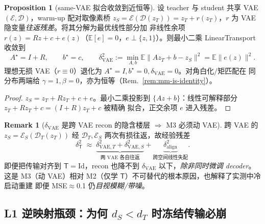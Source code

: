 \documentclass[11pt,a4paper]{article}
\newcommand{\E}{\mathbb{E}}
\newcommand{\Enc}{\mathcal{E}}
\newcommand{\Dec}{\mathcal{D}}
\newcommand{\Tmap}{\mathsf{T}}
\theoremstyle{definition}
\newtheorem{remark}{Remark}
\newtheorem{proposition}{Proposition}
\begin{document}
\begin{proposition}[same-VAE 拟合收敛到近恒等]
\label{prop:samevae-identity}
设 teacher 与 student 共享 VAE $(\Enc,\Dec)$，warm-up 配对取像素桥
$z_S=\Enc(\Dec(z_T))=z_T+r(z_T)$，$r$ 为 VAE 隐变量\emph{往返残差}。将其分解为最优线性部分加
非线性余项 $r(z)=Rz+c+e(z)$（$\E[e]=0$，$e\perp\{z,1\}$）。则最小二乘 LinearTransport 收敛到
\[
A^\star=I+R,\qquad b^\star=c,\qquad
\delta_{\mathrm{VAE}}^2:=\min_{A,b}\E\lVert Az_T+b-z_S\rVert^2=\E\lVert e(z)\rVert^2 .
\]
理想无损 VAE（$r\equiv0$）退化为 $A^\star=I,b^\star=0,\delta_{\mathrm{VAE}}=0$。对角白化/矩匹配在
同分布两端给 $\gamma{=}1,\beta{=}0$，亦为恒等（Rem.~\ref{rem:mm-is-identity}）。
\end{proposition}
\begin{proof}
$z_S=z_T+Rz_T+c+e$。最小二乘投影到 $\{Az+b\}$：线性可解释部分 $z_T+Rz_T+c=(I+R)z_T+c$ 被精确
拟合，正交余项 $e$ 进入残差。
\end{proof}

\begin{remark}[$\delta_{\mathrm{VAE}}$ 是跨 VAE recon 的隐含楼层 $\Rightarrow$ M3 必须动 VAE]
\label{rem:vae-floor}
跨 VAE 的 $z_S=\Enc_S(\Dec_T(z_T))$ 经 $\Dec_T,\Enc_S$ 两次有损往返，故经验残差
\[
\delta_{\Tmap}^2 \;\approx\; \underbrace{\delta_{\mathrm{VAE},T}^2+\delta_{\mathrm{VAE},S}^2}_{\text{两 VAE 各自往返}}+\underbrace{\delta_{\mathrm{align}}^2}_{\text{跨空间线性失配}} .
\]
即便把传输对齐到 $\Tmap=\mathrm{Id}$，recon 也降不到 $\delta_{\mathrm{VAE}}$ 以下，\emph{除非同时微调
decoder}。这是 M3（动 VAE）相对 M2（仅学 $\Tmap$）不可替代的根本原因，也解释了实测中冷启动重建
即便 MSE$\approx$0.1 仍\emph{目视模糊/带噪}。
\end{remark}

\subsection[L1 逆映射瓶颈]
{L1 逆映射瓶颈：为何 $d_S<d_T$ 时冻结传输必崩}
\end{document}
